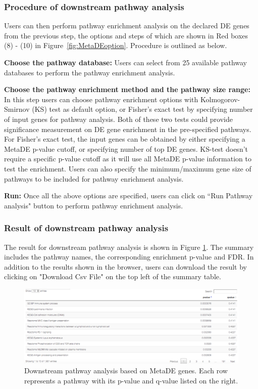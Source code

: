 \subsubsection{Procedure of downstream pathway analysis}
Users can then perform pathway enrichment analysis on the declared DE genes from the previous step, 
the options and steps of which are shown in {\color{red} Red boxes (8) - (10)} in Figure~\ref{fig:MetaDEoption}.
Procedure is outlined as below.

\begin{steps}
\item \textbf{Choose the pathway database:}
Users can select from 25 available pathway databases to perform the pathway enrichment analysis. 

\item \textbf{Choose the pathway enrichment method and the pathway size range:}
In this step users can choose pathway enrichment options with Kolmogorov-Smirnov (KS) test as default option,
or Fisher's exact test by specifying number of input genes for pathway analysis.
Both of these two tests could provide significance measurement on DE gene enrichment in the pre-specified pathways.
For Fisher's exact test, the input genes can be obtained by either specifying a MetaDE p-value cutoff, or specifying number of top DE genes.
KS-test doesn't require a specific p-value cutoff as it will use all MetaDE p-value information to test the enrichment.
Users can also specify the minimum/maximum gene size of pathways to be included for pathway enrichment analysis.

\item \textbf{Run:}
Once all the above options are specified, users can click on ``Run Pathway analysis" button to perform pathway enrichment analysis.

\end{steps}


\subsubsection{Result of downstream pathway analysis}

The result for downstream pathway analysis is shown in Figure \ref{fig:MetaDEresult2}. 
The summary includes the pathway names, the corresponding enrichment p-value and FDR. 
In addition to the results shown in the browser, 
users can download the result by clicking on "Download Csv File" on the top left of the summary table. 

\begin{figure}[H]
\begin{center}
\includegraphics[scale=0.5]{./figure/metaDE/MetaDE_pathway.pdf}
\caption{Downstream pathway analysis based on MetaDE genes.
Each row represents a pathway with its p-value and q-value listed on the right.
}
\label{fig:MetaDEresult2}
\end{center}
\end{figure}



